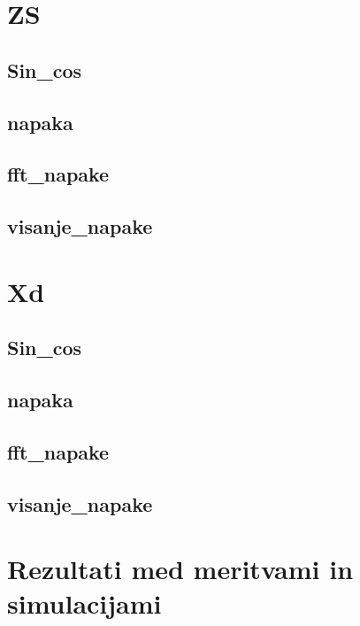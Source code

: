 \section{ZS}
\subsection{Sin\_cos}
\subsection{napaka}
\subsection{fft\_napake}
\subsection{visanje\_napake}
\section{Xd}
\subsection{Sin\_cos}
\subsection{napaka}
\subsection{fft\_napake}
\subsection{visanje\_napake}
\section{Rezultati med meritvami in simulacijami}